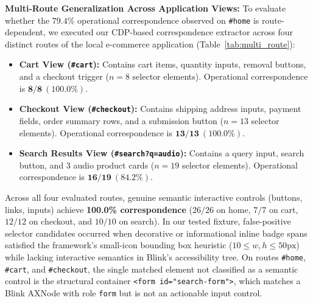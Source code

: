 \documentclass[11pt,a4paper]{article}
\begin{document}
\textbf{Multi-Route Generalization Across Application Views:}
To evaluate whether the $79.4\%$ operational correspondence observed on \texttt{\#home} is route-dependent, we executed our CDP-based correspondence extractor across four distinct routes of the local e-commerce application (Table~\ref{tab:multi_route}):
\begin{itemize}
    \item \textbf{Cart View (\texttt{\#cart}):} Contains cart items, quantity inputs, removal buttons, and a checkout trigger ($n=8$ selector elements). Operational correspondence is $\mathbf{8/8\ (100.0\%)}$.
    \item \textbf{Checkout View (\texttt{\#checkout}):} Contains shipping address inputs, payment fields, order summary rows, and a submission button ($n=13$ selector elements). Operational correspondence is $\mathbf{13/13\ (100.0\%)}$.
    \item \textbf{Search Results View (\texttt{\#search?q=audio}):} Contains a query input, search button, and 3 audio product cards ($n=19$ selector elements). Operational correspondence is $\mathbf{16/19\ (84.2\%)}$.
\end{itemize}
Across all four evaluated routes, genuine semantic interactive controls (buttons, links, inputs) achieve \textbf{100.0\% correspondence} ($26/26$ on home, $7/7$ on cart, $12/12$ on checkout, and $10/10$ on search). In our tested fixture, false-positive selector candidates occurred when decorative or informational inline badge spans satisfied the framework's small-icon bounding box heuristic ($10 \le w, h \le 50\text{px}$) while lacking interactive semantics in Blink's accessibility tree. On routes \texttt{\#home}, \texttt{\#cart}, and \texttt{\#checkout}, the single matched element not classified as a semantic control is the structural container \texttt{<form id="search-form">}, which matches a Blink AXNode with role \texttt{form} but is not an actionable input control.
\end{document}
